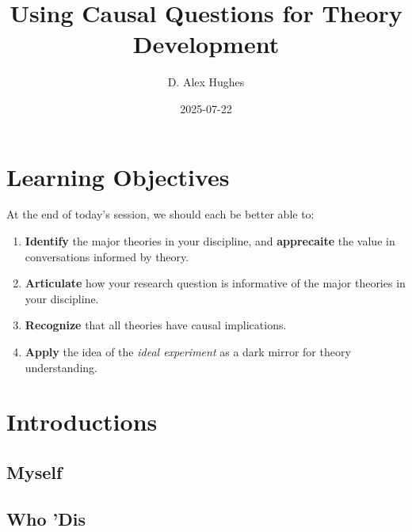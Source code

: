 \documentclass[
  letterpaper,
  DIV=11,
  numbers=noendperiod]{scrreprt}
\title{Using Causal Questions for Theory Development}
\author{D. Alex Hughes}
\date{2025-07-22}
\providecommand{\tightlist}{%
  \setlength{\itemsep}{0pt}\setlength{\parskip}{0pt}}\usepackage{longtable,booktabs,array}
\renewcommand*\contentsname{Table of contents}
\newcommand\contentsname{Table of contents}
\begin{document}
\maketitle

\renewcommand*\contentsname{Table of contents}
{
\hypersetup{linkcolor=}
\setcounter{tocdepth}{2}
\tableofcontents
}


\chapter*{Learning Objectives}\label{learning-objectives}


At the end of today's session, we should each be better able to:

\begin{enumerate}
\def\labelenumi{\arabic{enumi}.}
\tightlist
\item
  \textbf{Identify} the major theories in your discipline, and
  \textbf{apprecaite} the value in conversations informed by theory.
\item
  \textbf{Articulate} how your research question is informative of the
  major theories in your discipline.
\item
  \textbf{Recognize} that all theories have causal implications.
\item
  \textbf{Apply} the idea of the \emph{ideal experiment} as a dark
  mirror for theory understanding.
\end{enumerate}


\chapter{Introductions}\label{introductions}

\section{Myself}\label{myself}

\section{Who 'Dis}\label{who-dis}
\end{document}
